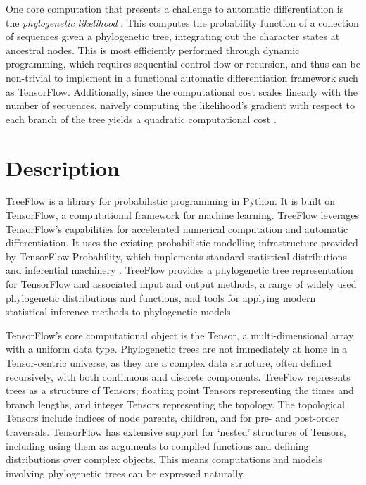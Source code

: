 One core computation that presents a challenge to automatic differentiation is the \textit{phylogenetic likelihood} \cite{felsenstein1981evolutionary}. This computes the probability function of a collection of sequences given a phylogenetic tree, integrating out the character states at ancestral nodes. This is most efficiently performed through dynamic programming, which requires sequential control flow or recursion, and thus can be non-trivial to implement in a functional automatic differentiation framework such as TensorFlow. Additionally, since the computational cost scales linearly with the number of sequences, naively computing the likelihood's gradient with respect to each branch of the tree yields a quadratic computational cost \cite{ji2020gradients}.

\section{Description}

TreeFlow is a library for probabilistic programming in Python. It is built on TensorFlow, a computational framework for machine learning. TreeFlow leverages TensorFlow's capabilities for accelerated numerical computation and automatic differentiation. It uses the existing probabilistic modelling infrastructure provided by TensorFlow Probability, which implements standard statistical distributions and inferential machinery \cite{dillon2017tensorflow}. TreeFlow provides a phylogenetic tree representation for TensorFlow and associated input and output methods, a range of widely used phylogenetic distributions and functions, and tools for applying modern statistical inference methods to phylogenetic models.

TensorFlow's core computational object is the Tensor, a multi-dimensional array with a uniform data type. Phylogenetic trees are not immediately at home in a Tensor-centric universe, as they are a complex data structure, often defined recursively, with both continuous and discrete components. TreeFlow represents trees as a structure of Tensors; floating point Tensors representing the times and branch lengths, and integer Tensors representing the topology. The topological Tensors include indices of node parents, children, and for pre- and post-order traversals. TensorFlow has extensive support for `nested' structures of Tensors, including using them as arguments to compiled functions and defining distributions over complex objects. This means computations and models involving phylogenetic trees can be expressed naturally.


